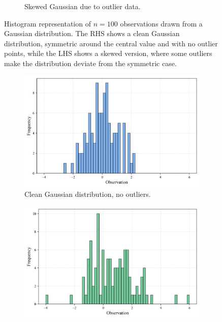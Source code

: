 \documentclass{book}
\begin{document}
\begin{figure}[ht]
\begin{subfigure}[b]{0.48\textwidth}
        \caption{Skewed Gaussian due to outlier data.}
        \label{fig:histogram2}
    \end{subfigure}
    \caption{Histogram representation of $n = 100$ observations drawn from a Gaussian distribution. The RHS shows a clean Gaussian distribution, symmetric around the central value and with no outlier points, while the LHS shows a skewed version, where some outliers make the distribution deviate from the symmetric case.}
    \label{fig:histogram_comparison1}
\end{figure}


\begin{figure}[ht]
    \centering
    \begin{subfigure}[b]{0.48\textwidth}
        \centering
        \includegraphics[width=\textwidth, height=0.7\textwidth]{figures/chapter1/histogram1_bins_small.png}
        \caption{Clean Gaussian distribution, no outliers.}
        \label{fig:histogram1_bins_small}
    \end{subfigure}
    \hfill
    \begin{subfigure}[b]{0.48\textwidth}
        \centering
        \includegraphics[width=\textwidth, height=0.7\textwidth]{figures/chapter1/histogram2_bins_small.png}

\end{subfigure}
\end{figure}
\end{document}
